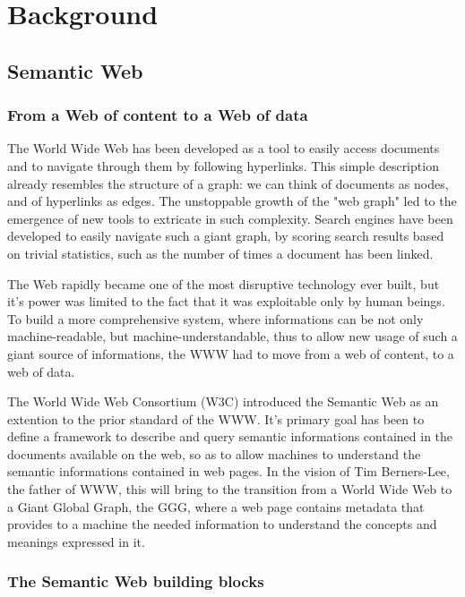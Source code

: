 \documentclass[%
    corpo=13.5pt,
    twoside,
    oldstyle,
    tipotesi=magistrale,
    greek,
    evenboxes
]{toptesi}
\begin{document}
\chapter{Background}

\section{Semantic Web}

\subsection{From a Web of content to a Web of data}

The World Wide Web has been developed as a tool to easily access documents
and to navigate through them by following hyperlinks. This simple description
already resembles the structure of a graph: we can think of documents as
nodes, and of hyperlinks as edges. The unstoppable growth of the "web graph" led to
the emergence of new tools to extricate in such complexity. Search engines have been
developed to easily navigate such a giant graph, by scoring search results based on
trivial statistics, such as the number of times a document has been linked.
\newline

The Web rapidly became one of the most disruptive technology ever built, but it's power
was limited to the fact that it was exploitable only by human beings. To build a more
comprehensive system, where informations can be not only machine-readable, but
machine-understandable, thus to allow new usage of such a giant source of informations,
the WWW had to move from a web of content, to a web of data.
\newline

The World Wide Web Consortium (W3C) introduced the Semantic Web as an extention
to the prior standard of the WWW. It's primary goal has been
to define a framework to describe and query semantic informations contained
in the documents available on the web, so as to allow machines to understand
the semantic informations contained in web pages. In the vision of Tim
Berners-Lee, the father of WWW, this will bring to the transition from a
World Wide Web to a Giant Global Graph, the GGG, where a
web page contains metadata that provides to a machine the needed information to
understand the concepts and meanings expressed in it.



\subsection{The Semantic Web building blocks}
\end{document}
